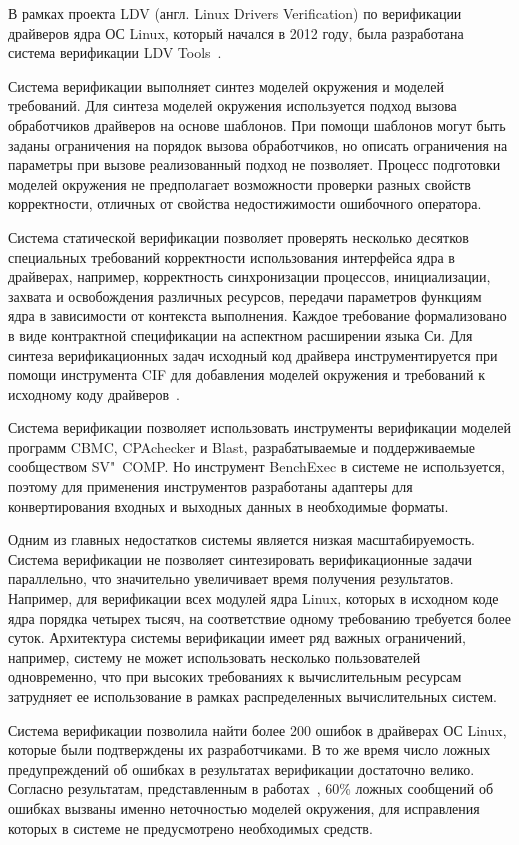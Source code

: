 В рамках проекта LDV (англ. Linux Drivers Verification) по верификации драйверов ядра ОС Linux, который начался в 2012 году, была разработана система верификации LDV Tools~\cite{configurable:Trudy, Zakharov2015, Beyer:2012:LDV}.

Система верификации выполняет синтез моделей окружения и моделей требований.
Для синтеза моделей окружения используется подход вызова обработчиков драйверов на основе шаблонов.
При помощи шаблонов могут быть заданы ограничения на порядок вызова обработчиков, но описать ограничения на параметры при вызове реализованный подход не позволяет.
Процесс подготовки моделей окружения не предполагает возможности проверки разных свойств корректности, отличных от свойства недостижимости ошибочного оператора.

Система статической верификации позволяет проверять несколько десятков специальных требований корректности использования интерфейса ядра в драйверах, например, корректность синхронизации процессов, инициализации, захвата и освобождения различных ресурсов, передачи параметров функциям ядра в зависимости от контекста выполнения.
Каждое требование формализовано в виде контрактной спецификации на аспектном расширении языка Си.
Для синтеза верификационных задач исходный код драйвера инструментируется при помощи инструмента CIF для добавления моделей окружения и требований к исходному коду драйверов~\cite{Novikov2013}.

Система верификации позволяет использовать инструменты верификации моделей программ CBMC, CPAchecker и Blast, разрабатываемые и поддерживаемые сообществом SV"~COMP.
Но инструмент BenchExec в системе не используется, поэтому для применения инструментов разработаны адаптеры для конвертирования входных и выходных данных в необходимые форматы.

Одним из главных недостатков системы является низкая масштабируемость.
Система верификации не позволяет синтезировать верификационные задачи параллельно, что значительно увеличивает время получения результатов.
Например, для верификации всех модулей ядра Linux, которых в исходном коде ядра порядка четырех тысяч, на соответствие одному требованию требуется более суток.
Архитектура системы верификации имеет ряд важных ограничений, например, систему не может использовать несколько пользователей одновременно, что при высоких требованиях к вычислительным ресурсам затрудняет ее использование в рамках распределенных вычислительных систем.

Система верификации позволила найти более 200 ошибок в драйверах ОС Linux, которые были подтверждены их разработчиками.
В то же время число ложных предупреждений об ошибках в результатах верификации достаточно велико.
Согласно результатам, представленным в работах~\cite{configurable:Trudy, Zakharov2015}, 60\% ложных сообщений об ошибках вызваны именно неточностью моделей окружения, для исправления которых в системе не предусмотрено необходимых средств.

